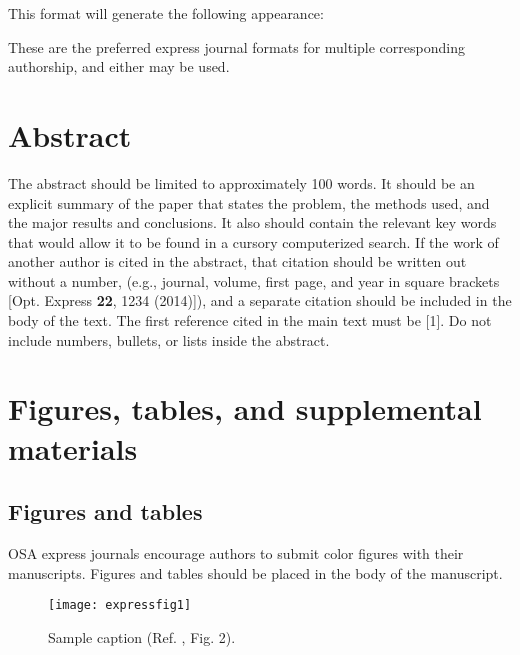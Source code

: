 \documentclass[10pt]{article}
\begin{document}
This format will generate the following appearance:\\

\author{Author One and Author Two}

\address{Peer Review, Publications Department,
Optical Society of America, 2010 Massachusetts Avenue NW, Washington, DC 20036, USA\\
Publications Department, Optical Society of America, 2010 Massachusetts Avenue NW, Washington, DC 20036, USA\\
xyz@osa.org\\
opex@osa.org}
\medskip
These are the preferred express journal formats for multiple corresponding authorship, and either may be used.

\section{Abstract}
The abstract should be limited to approximately 100 words. It should be an explicit summary of the paper that states the problem, the methods used, and the major results and conclusions. It also should contain the relevant key words that would allow it to be found in a cursory computerized search. If the work of another author is cited in the abstract, that citation should be written out without a number, (e.g., journal, volume, first page, and year in square brackets [Opt. Express {\bfseries 22}, 1234 (2014)]), and a separate citation should be included in the body of the text. The first reference cited in the main text must be [1]. Do not include numbers, bullets, or lists inside the abstract.

\section{Figures, tables, and supplemental materials}

\subsection{Figures and tables}

OSA express journals encourage authors to submit color figures with their manuscripts. Figures and tables should be placed in the body of the manuscript.

\begin{figure}[ht!]
\centering\texttt{[image: expressfig1]}
\caption{Sample caption (Ref. \cite{Oron03}, Fig. 2).}
\end{figure}
\end{document}
